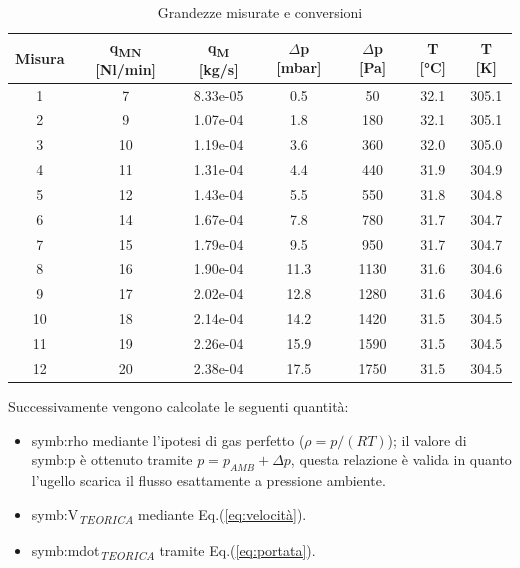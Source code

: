 \begin{table}[H]
	\centering
	\begin{tabular}{c|c|c|c|c|c|c}
		\toprule
		\toprule
		\textbf{Misura}& \textbf{q\textsubscript{MN} [Nl/min]}  & \textbf{q\textsubscript{M} [kg/s]}& \textbf{$\Delta$p [mbar]}  & \textbf{$\Delta$p [Pa]} & \textbf{T [°C]}  & \textbf{T [K] } \\
	\midrule
	\midrule
1  & 7  &8.33e-05 	& 0.5 & 50   & 32.1 & 305.1 \\
		\midrule
		2  & 9  &1.07e-04& 1.8 & 180  & 32.1 & 305.1 \\\midrule
		3  & 10 &1.19e-04& 3.6 & 360  & 32.0   & 305.0   \\\midrule
		4  & 11 &1.31e-04& 4.4 & 440  & 31.9 & 304.9 \\\midrule
		5  & 12 &1.43e-04& 5.5 & 550  & 31.8 & 304.8 \\\midrule
		6  & 14 &1.67e-04& 7.8 & 780  & 31.7 & 304.7 \\\midrule
		7  & 15 &1.79e-04& 9.5 & 950  & 31.7 & 304.7 \\\midrule
		8  & 16 &1.90e-04& 11.3 & 1130 & 31.6 & 304.6 \\\midrule
		9  & 17 &2.02e-04& 12.8 & 1280 & 31.6 & 304.6 \\\midrule
		10 & 18 &2.14e-04& 14.2 & 1420 & 31.5 & 304.5 \\\midrule
		11 & 19 &2.26e-04& 15.9 & 1590 & 31.5 & 304.5 \\\midrule
		12 & 20 &2.38e-04& 17.5 & 1750 & 31.5 & 304.5 \\
		\bottomrule
		\bottomrule
	\end{tabular}
	\caption{Grandezze misurate e conversioni}
	\label{tab:dati}
\end{table}

Successivamente vengono calcolate le seguenti quantità:
\begin{itemize}
	\item \gls{symb:rho} mediante l'ipotesi di gas perfetto ($\rho = p/(RT)$); il valore di \gls{symb:p} è ottenuto tramite $p=p_{\textit{AMB}}+\Delta p$, questa relazione è valida in quanto l'ugello scarica il flusso esattamente a pressione ambiente. 
	\item \gls{symb:V}\textsubscript{\textit{TEORICA}} mediante Eq.(\ref{eq:velocità}).
	\item \gls{symb:mdot}\textsubscript{\textit{TEORICA}} tramite Eq.(\ref{eq:portata}).
\end{itemize}


